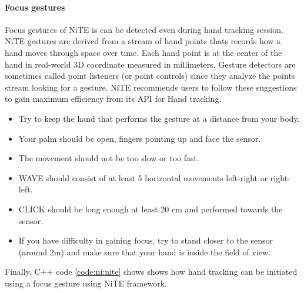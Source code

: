 \paragraph*{Focus gestures} Focus gestures of NiTE is can be detected even during hand tracking session. NiTE gestures are derived from a stream of hand points thats records how a hand moves through space over time. Each hand point is at the center of the hand in real-world 3D coordinate measured in millimeters. Gesture detectors are sometimes called point listeners (or point controls) since they analyze the points stream looking for a gesture. NiTE recommends users to follow these suggestions to gain maximum efficiency from its API for Hand tracking.
\begin{itemize}
	\item Try to keep the hand that performs the gesture at a distance from your body. 
	\item Your palm should be open, fingers pointing up and face the sensor. 
	\item The movement should not be too slow or too fast. 
	\item WAVE should consist of at least 5 horizontal movements left-right or right-left. 
	\item CLICK should be long enough at least 20 cm and performed towards the sensor. 
	\item If you have difficulty in gaining focus, try to stand closer to the sensor (around 2m) and make sure that your hand is inside the field of view. 
\end{itemize}

Finally, C++ code \ref{code:ni:nite} shows shows how hand tracking can be initiated using a focus gesture using NiTE framework. 

 \label{code:ni:nite}
